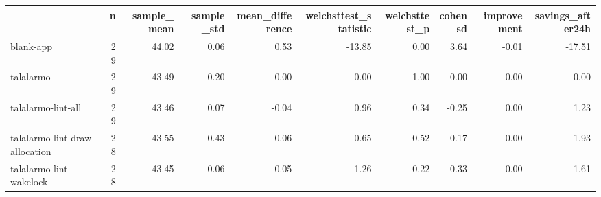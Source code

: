 \begin{tabular}{lrrrrrrrrr}
\toprule
{} &   n &  sample\_mean &  sample\_std &  mean\_difference &  welchsttest\_statistic &  welchsttest\_p &  cohensd &  improvement &  savings\_after24h \\
\midrule
blank-app                      &  29 &        44.02 &        0.06 &             0.53 &                 -13.85 &           0.00 &     3.64 &        -0.01 &            -17.51 \\
talalarmo                      &  29 &        43.49 &        0.20 &             0.00 &                   0.00 &           1.00 &     0.00 &        -0.00 &             -0.00 \\
talalarmo-lint-all             &  29 &        43.46 &        0.07 &            -0.04 &                   0.96 &           0.34 &    -0.25 &         0.00 &              1.23 \\
talalarmo-lint-draw-allocation &  28 &        43.55 &        0.43 &             0.06 &                  -0.65 &           0.52 &     0.17 &        -0.00 &             -1.93 \\
talalarmo-lint-wakelock        &  28 &        43.45 &        0.06 &            -0.05 &                   1.26 &           0.22 &    -0.33 &         0.00 &              1.61 \\
\bottomrule
\end{tabular}
